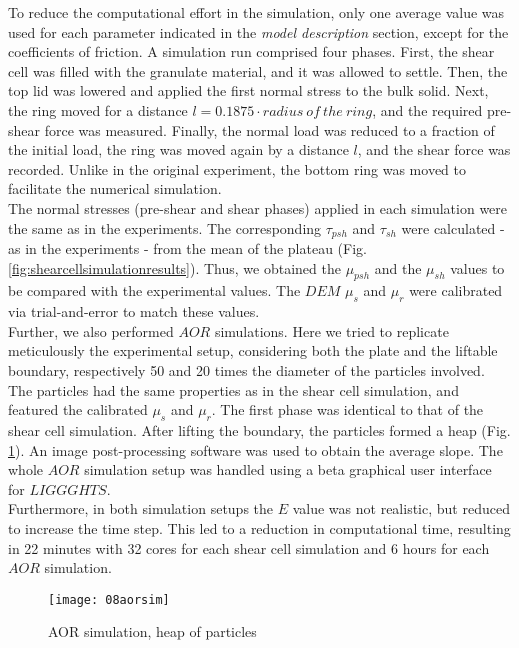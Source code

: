 \documentclass{CFD2015}
\begin{document}
To reduce the computational effort in the simulation, only one average value was used for each parameter indicated in the \textit{model description} section, except for the coefficients of friction.
A simulation run comprised four phases. 
First, the shear cell was filled with the granulate material, and it was allowed to settle. 
Then, the top lid was lowered and applied the first normal stress to the bulk solid. 
Next, the ring moved for a distance $l=0.1875 \cdot radius ~of ~the ~ring$, and the required pre-shear force was measured. 
Finally, the normal load was reduced to a fraction of the initial load, the ring was moved again by a distance $l$, and the shear force was recorded. 
Unlike in the original experiment, the bottom ring was moved to facilitate the numerical simulation.\\
The normal stresses (pre-shear and shear phases) applied in each simulation were the same as in the experiments. The corresponding $\tau_{psh}$ and $\tau_{sh}$ were calculated - as in the experiments - from the mean of the plateau (Fig. \ref{fig:shearcellsimulationresults}).
Thus, we obtained the $\mu_{psh}$ and the $\mu_{sh}$ values to be compared with the experimental values. 
The $DEM$ $ \mu_s $ and $ \mu_r $ were calibrated via trial-and-error to match these values.\\
Further, we also performed $AOR$ simulations. Here we tried to replicate meticulously the experimental setup, considering both the plate and the liftable boundary, respectively 50 and 20 times the diameter of the particles involved.
The particles had the same properties as in the shear cell simulation, and featured the calibrated $ \mu_s $ and $ \mu_r $.
The first phase was identical to that of the shear cell simulation. 
After lifting the boundary, the particles formed a heap (Fig. \ref{fig:08aorsim}). 
An image post-processing software was used to obtain the average slope.
The whole $AOR$ simulation setup was handled using a beta graphical user interface for $LIGGGHTS$.\\
Furthermore, in both simulation setups the $E$ value was not realistic, but reduced to increase the time step.
This led to a reduction in computational time, resulting in 22 minutes with 32 cores for each shear cell simulation and 6 hours for each $AOR$ simulation.\\


\begin{figure}[!htb] 
\centering 
\texttt{[image: 08aorsim]} 
\caption[AORS]{AOR simulation, heap of particles}
\label{fig:08aorsim} 
\end{figure}
\end{document}
